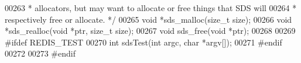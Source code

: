 \begin{DoxyCode}
00263 \textcolor{comment}{ * allocators, but may want to allocate or free things that SDS will}
00264 \textcolor{comment}{ * respectively free or allocate. */}
00265 \textcolor{keywordtype}{void} *sds\_malloc(size\_t size);
00266 \textcolor{keywordtype}{void} *sds\_realloc(\textcolor{keywordtype}{void} *ptr, size\_t size);
00267 \textcolor{keywordtype}{void} sds\_free(\textcolor{keywordtype}{void} *ptr);
00268 
00269 \textcolor{preprocessor}{#}\textcolor{preprocessor}{ifdef} \textcolor{preprocessor}{REDIS\_TEST}
00270 \textcolor{keywordtype}{int} sdsTest(\textcolor{keywordtype}{int} argc, \textcolor{keywordtype}{char} *argv[]);
00271 \textcolor{preprocessor}{#}\textcolor{preprocessor}{endif}
00272 
00273 \textcolor{preprocessor}{#}\textcolor{preprocessor}{endif}
\end{DoxyCode}
